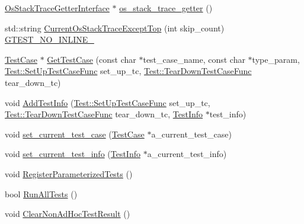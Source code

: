 \begin{DoxyCompactItemize}
\item 
\hyperlink{classtesting_1_1internal_1_1_os_stack_trace_getter_interface}{Os\-Stack\-Trace\-Getter\-Interface} $\ast$ \hyperlink{classtesting_1_1internal_1_1_unit_test_impl_a28c00108f774624044557d95379ce099}{os\-\_\-stack\-\_\-trace\-\_\-getter} ()
\item 
std\-::string \hyperlink{classtesting_1_1internal_1_1_unit_test_impl_a61c0a51ac4e57d9f884f646ca6dd2210}{Current\-Os\-Stack\-Trace\-Except\-Top} (int skip\-\_\-count) \hyperlink{gtest-port_8h_a9945cbd967fbccb15f8de711f58955c7}{G\-T\-E\-S\-T\-\_\-\-N\-O\-\_\-\-I\-N\-L\-I\-N\-E\-\_\-}
\item 
\hyperlink{classtesting_1_1_test_case}{Test\-Case} $\ast$ \hyperlink{classtesting_1_1internal_1_1_unit_test_impl_a1595819a7edfd31949800b9e7ea563a2}{Get\-Test\-Case} (const char $\ast$test\-\_\-case\-\_\-name, const char $\ast$type\-\_\-param, \hyperlink{classtesting_1_1_test_a5f2a051d1d99c9b784c666c586186cf9}{Test\-::\-Set\-Up\-Test\-Case\-Func} set\-\_\-up\-\_\-tc, \hyperlink{classtesting_1_1_test_aa0f532e93b9f3500144c53f31466976c}{Test\-::\-Tear\-Down\-Test\-Case\-Func} tear\-\_\-down\-\_\-tc)
\item 
void \hyperlink{classtesting_1_1internal_1_1_unit_test_impl_a1cc87dfc91377ebec4a3ff4192dfcba9}{Add\-Test\-Info} (\hyperlink{classtesting_1_1_test_a5f2a051d1d99c9b784c666c586186cf9}{Test\-::\-Set\-Up\-Test\-Case\-Func} set\-\_\-up\-\_\-tc, \hyperlink{classtesting_1_1_test_aa0f532e93b9f3500144c53f31466976c}{Test\-::\-Tear\-Down\-Test\-Case\-Func} tear\-\_\-down\-\_\-tc, \hyperlink{classtesting_1_1_test_info}{Test\-Info} $\ast$test\-\_\-info)
\item 
void \hyperlink{classtesting_1_1internal_1_1_unit_test_impl_a7f0e79bdabd28819cc857e316a36a350}{set\-\_\-current\-\_\-test\-\_\-case} (\hyperlink{classtesting_1_1_test_case}{Test\-Case} $\ast$a\-\_\-current\-\_\-test\-\_\-case)
\item 
void \hyperlink{classtesting_1_1internal_1_1_unit_test_impl_ab72211c99ce4427dfb472d6ecea62989}{set\-\_\-current\-\_\-test\-\_\-info} (\hyperlink{classtesting_1_1_test_info}{Test\-Info} $\ast$a\-\_\-current\-\_\-test\-\_\-info)
\item 
void \hyperlink{classtesting_1_1internal_1_1_unit_test_impl_af84d2515f1a272a8783f00a3e8c0aff8}{Register\-Parameterized\-Tests} ()
\item 
bool \hyperlink{classtesting_1_1internal_1_1_unit_test_impl_a1fb6be9971f4768c4136a05aa9e7e375}{Run\-All\-Tests} ()
\item 
void \hyperlink{classtesting_1_1internal_1_1_unit_test_impl_a96c2a5b23541ef01020c402644563ba1}{Clear\-Non\-Ad\-Hoc\-Test\-Result} ()

\end{DoxyCompactItemize}
